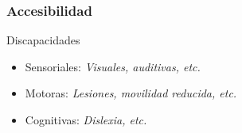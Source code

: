 \documentclass[usenames,dvipsnames]{beamer}
\begin{document}
\begin{frame} 
\frametitle{Accesibilidad} 
  \begin{block}{Discapacidades}
    \begin{itemize}
      \item Sensoriales: \emph{Visuales, auditivas, etc.}
      \item Motoras: \emph{Lesiones, movilidad reducida, etc.}
      \item Cognitivas: \emph{Dislexia, etc.}
    \end{itemize}
  \end{block}

  \pause

  \begin{columns}
  \begin{column}{0.5\textwidth}
    \begin{center}
    \end{center}
  \end{column}
  \begin{column}{0.5\textwidth}
    \begin{center}
    \end{center}
  \end{column}
  \end{columns}
\end{frame} 
\end{document}
